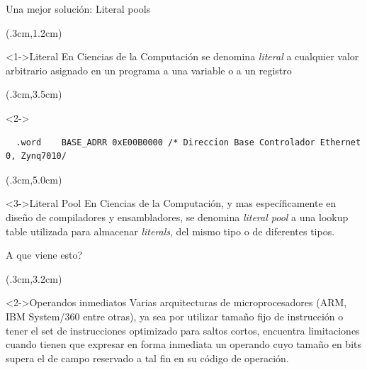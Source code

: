 \documentclass[usenames,table,dvipsnames,aspectratio=169]{beamer}
\begin{document}
\begin{frame}[fragile]{Una mejor solución: Literal pools}
 \begin{textblock*}{\textwidth}(.3cm,1.2cm)
  \begin{block}<1->{Literal} \justifying
   En Ciencias de la Computación se denomina \textit{literal} a cualquier valor arbitrario asignado en un programa a una variable o a un registro
  \end{block}
 \end{textblock*}
 \begin{textblock*}{\textwidth}(.3cm,3.5cm)
  \vspace{-.5cm}
  \begin{onlyenv}<2->
   \begin{lstlisting}
  .word    BASE_ADRR 0xE00B0000 /* Direccion Base Controlador Ethernet 0, Zynq7010/
   \end{lstlisting}
  \end{onlyenv}
 \end{textblock*}
 \begin{textblock*}{\textwidth}(.3cm,5.0cm)
  \begin{block}<3->{Literal Pool}
   \justifying
   En Ciencias de la Computación, y mas específicamente en diseño de compiladores y ensambladores, se denomina \textit{literal pool} a una lookup table utilizada para almacenar \textit{literals}, del mismo tipo o de diferentes tipos.
  \end{block}
 \end{textblock*}
\end{frame}

\begin{frame}[fragile]{\textquestiondown A que viene esto?}
 \begin{textblock*}{\textwidth}(.3cm,3.2cm)
  \begin{block}<2->{Operandos inmediatos} \justifying
   Varias arquitecturas de microprocesadores (ARM, IBM System/360 entre otras), ya sea por utilizar tamaño fijo de instrucción o tener el set de instrucciones optimizado para saltos cortos, encuentra limitaciones cuando tienen que expresar en forma inmediata un operando cuyo tamaño en bits supera el de campo reservado a tal fin en su código de operación.
  \end{block}
 \end{textblock*}
\end{frame}
\end{document}

